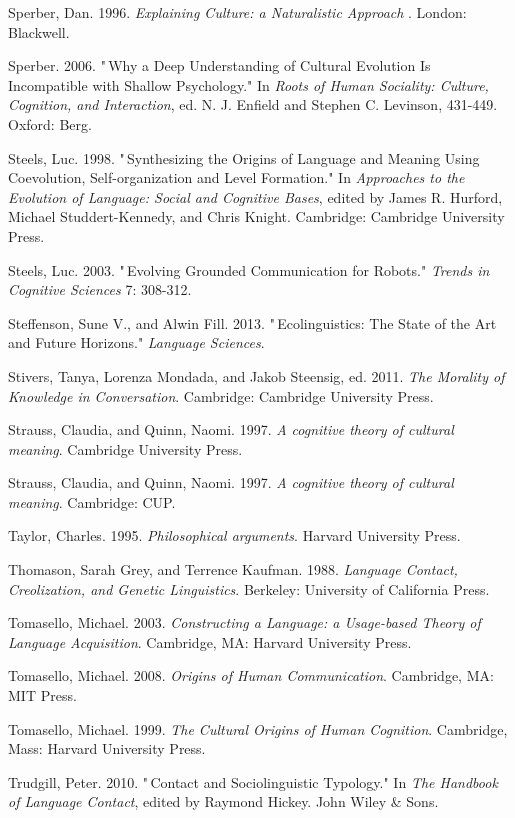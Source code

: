 Sperber, Dan. 1996. \textit{Explaining Culture: a Naturalistic Approach
}. London: Blackwell.

Sperber. 2006. "\,Why a Deep Understanding of Cultural Evolution Is 
Incompatible with Shallow Psychology." In \textit{Roots of Human 
Sociality: Culture, Cognition, and Interaction}, ed. N. J. Enfield and 
Stephen C. Levinson, 431-449. Oxford: Berg.

Steels, Luc. 1998. "\,Synthesizing the Origins of Language and Meaning 
Using Coevolution, Self-organization and Level Formation." In \textit{
Approaches to the Evolution of Language: Social and Cognitive Bases}, 
edited by James R. Hurford, Michael Studdert-Kennedy, and Chris Knight. 
Cambridge: Cambridge University Press.

Steels, Luc. 2003. "\,Evolving Grounded Communication for Robots." 
\textit{Trends in Cognitive Sciences} 7: 308-312.

Steffenson, Sune V., and Alwin Fill. 2013. "\,Ecolinguistics: The State 
of the Art and Future Horizons." \textit{Language Sciences}.

Stivers, Tanya, Lorenza Mondada, and Jakob Steensig, ed. 2011. \textit{
The Morality of Knowledge in Conversation}. Cambridge: Cambridge 
University Press.

Strauss, Claudia, and Quinn, Naomi. 1997. \textit{A cognitive theory of 
cultural meaning}. Cambridge University Press.

Strauss, Claudia, and Quinn, Naomi. 1997. \textit{A cognitive theory of 
cultural meaning}. Cambridge: CUP.

Taylor, Charles. 1995. \textit{Philosophical arguments}. Harvard 
University Press.

Thomason, Sarah Grey, and Terrence Kaufman. 1988. \textit{Language 
Contact, Creolization, and Genetic Linguistics}. Berkeley: University 
of California Press.

Tomasello, Michael. 2003. \textit{Constructing a Language: a 
Usage-based Theory of Language Acquisition}. Cambridge, MA: Harvard 
University Press.

Tomasello, Michael. 2008. \textit{Origins of Human Communication}. 
Cambridge, MA: MIT Press.

Tomasello, Michael. 1999. \textit{The Cultural Origins of Human 
Cognition}. Cambridge, Mass: Harvard University Press.

Trudgill, Peter. 2010. "\,Contact and Sociolinguistic Typology." In 
\textit{The Handbook of Language Contact}, edited by Raymond Hickey. 
John Wiley \& Sons.

